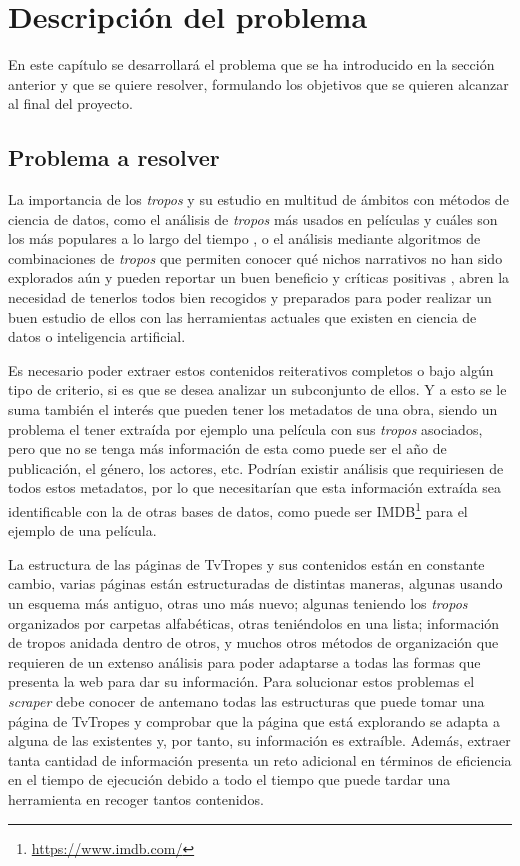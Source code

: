 \chapter{Descripción del problema}

En este capítulo se desarrollará el problema que se ha introducido en la sección
anterior y que se quiere resolver, formulando los objetivos que se quieren
alcanzar al final del proyecto.

\section{Problema a resolver}
La importancia de los \textit{tropos} y su estudio en multitud de ámbitos con
métodos de ciencia de datos, como el análisis de \textit{tropos} más usados en
películas y cuáles son los más populares a lo largo del tiempo
\cite{garcia2020tropes}, o el análisis mediante algoritmos de combinaciones de
\textit{tropos} que permiten conocer qué nichos narrativos no han sido
explorados aún y pueden reportar un buen beneficio y críticas positivas
\cite{garcia2021simpsons}, abren la necesidad de tenerlos todos bien recogidos y
preparados para poder realizar un buen estudio de ellos con las herramientas
actuales que existen en ciencia de datos o inteligencia artificial. 

Es necesario poder extraer estos contenidos reiterativos completos o bajo algún
tipo de criterio, si es que se desea analizar un subconjunto de ellos. Y a esto
se le suma también el interés que pueden tener los metadatos de una obra, siendo
un problema el tener extraída por ejemplo una película con sus \textit{tropos}
asociados, pero que no se tenga más información de esta como puede ser el año de
publicación, el género, los actores, etc. Podrían existir análisis que
requiriesen de todos estos metadatos, por lo que necesitarían que esta
información extraída sea identificable con la de otras bases de datos, como
puede ser IMDB\footnote{\url{https://www.imdb.com/}} para el ejemplo de una
película.

La estructura de las páginas de TvTropes y sus contenidos están en constante
cambio, varias páginas están estructuradas de distintas maneras, algunas usando
un esquema más antiguo, otras uno más nuevo; algunas teniendo los
\textit{tropos} organizados por carpetas alfabéticas, otras teniéndolos en una
lista; información de tropos anidada dentro de otros, y muchos otros métodos de
organización que requieren de un extenso análisis para poder adaptarse a todas
las formas que presenta la web para dar su información. Para solucionar estos
problemas el \textit{scraper} debe conocer de antemano todas las estructuras que
puede tomar una página de TvTropes y comprobar que la página que está explorando
se adapta a alguna de las existentes y, por tanto, su información es extraíble.
Además, extraer tanta cantidad de información presenta un reto adicional en
términos de eficiencia en el tiempo de ejecución debido a todo el tiempo que
puede tardar una herramienta en recoger tantos contenidos.

